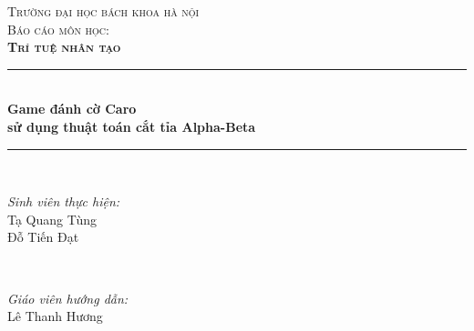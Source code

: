 \documentclass[12pt]{report}
\begin{document}
\begin{titlepage}

\newcommand{\HRule}{\rule{\linewidth}{0.5mm}} %

\center %
 

\textsc{\Large Trường đại học bách khoa hà nội}\\[1cm] %
\textsc{\large Báo cáo môn học:} \\[0.2cm]
\textsc{\LARGE\bfseries Trí tuệ nhân tạo}\\[1cm] %


\HRule \\[0.4cm]
{\LARGE \bfseries Game đánh cờ Caro}\\[0.03cm] %
{\LARGE \bfseries sử dụng thuật toán cắt tỉa Alpha-Beta}\\[0.03cm] %
\HRule \\[1.5cm]

 

\begin{minipage}{0.4\textwidth}
\begin{flushleft} \large
\emph{Sinh viên thực hiện:}\\
Tạ Quang Tùng \\
Đỗ Tiến Đạt
\end{flushleft}
\end{minipage}
~
\begin{minipage}{0.4\textwidth}
\begin{flushright} \large
\emph{Giáo viên hướng dẫn:} \\
Lê Thanh Hương
\end{flushright}
\end{minipage}\\[2cm]


\end{titlepage}
\end{document}
